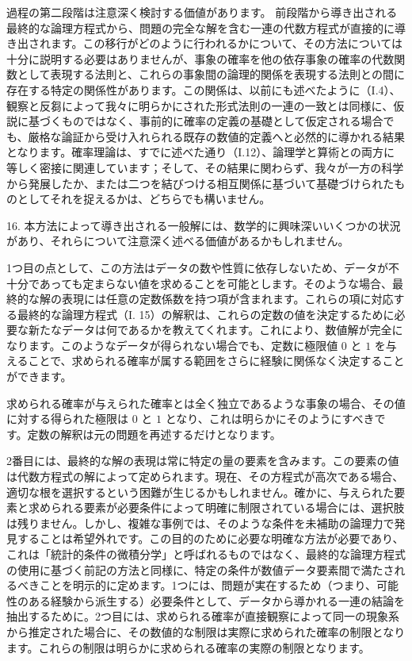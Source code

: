 \documentclass[a4paper,11pt,openany]{ltjsbook}
\begin{document}
過程の第二段階は注意深く検討する価値があります。
前段階から導き出される最終的な論理方程式から、問題の完全な解を含む一連の代数方程式が直接的に導き出されます。この移行がどのように行われるかについて、その方法については十分に説明する必要はありませんが、事象の確率を他の依存事象の確率の代数関数として表現する法則と、これらの事象間の論理的関係を表現する法則との間に存在する特定の関係性があります。この関係は、以前にも述べたように（I.4）、観察と反芻によって我々に明らかにされた形式法則の一連の一致とは同様に、仮説に基づくものではなく、事前的に確率の定義の基礎として仮定される場合でも、厳格な論証から受け入れられる既存の数値的定義へと必然的に導かれる結果となります。確率理論は、すでに述べた通り（I.12）、論理学と算術との両方に等しく密接に関連しています；そして、その結果に関わらず、我々が一方の科学から発展したか、または二つを結びつける相互関係に基づいて基礎づけられたものとしてそれを捉えるかは、どちらでも構いません。

16. 本方法によって導き出される一般解には、数学的に興味深いいくつかの状況があり、それらについて注意深く述べる価値があるかもしれません。

1つ目の点として、この方法はデータの数や性質に依存しないため、データが不十分であっても定まらない値を求めることを可能とします。そのような場合、最終的な解の表現には任意の定数係数を持つ項が含まれます。これらの項に対応する最終的な論理方程式（I. 15）の解釈は、これらの定数の値を決定するために必要な新たなデータは何であるかを教えてくれます。これにより、数値解が完全になります。このようなデータが得られない場合でも、定数に極限値 $0$ と $1$ を与えることで、求められる確率が属する範囲をさらに経験に関係なく決定することができます。

求められる確率が与えられた確率とは全く独立であるような事象の場合、その値に対する得られた極限は $0$ と $1$ となり、これは明らかにそのようにすべきです。定数の解釈は元の問題を再述するだけとなります。

2番目には、最終的な解の表現は常に特定の量の要素を含みます。この要素の値は代数方程式の解によって定められます。現在、その方程式が高次である場合、適切な根を選択するという困難が生じるかもしれません。確かに、与えられた要素と求められる要素が必要条件によって明確に制限されている場合には、選択肢は残りません。しかし、複雑な事例では、そのような条件を未補助の論理力で発見することは希望外れです。この目的のために必要な明確な方法が必要であり、これは「統計的条件の微積分学」と呼ばれるものではなく、最終的な論理方程式の使用に基づく前記の方法と同様に、特定の条件が数値データ要素間で満たされるべきことを明示的に定めます。1つには、問題が実在するため（つまり、可能性のある経験から派生する）必要条件として、データから導かれる一連の結論を抽出するために。2つ目には、求められる確率が直接観察によって同一の現象系から推定された場合に、その数値的な制限は実際に求められた確率の制限となります。これらの制限は明らかに求められる確率の実際の制限となります。
\end{document}
